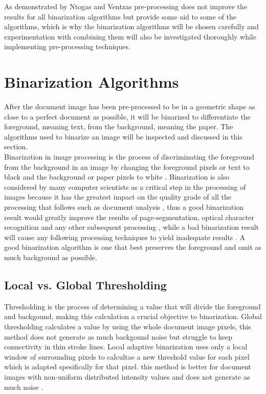 \documentclass[11pt]{article}
\begin{document}
			As demonstrated by Ntogas and Ventzas \cite{ntogas2008binarization} pre-processing does not improve the results for all binarization algorithms but provide some aid to some of the algorithms, which is why the binarization algorithms will be chosen carefully and experimentation with combining them will also be investigated thoroughly while implementing pre-processing techniques.

    \section{Binarization Algorithms}%
			After the document image has been pre-processed to be in a geometric shape as close to a perfect document as possible, it will be binarized to differentiate the foreground, meaning text, from the background, meaning the paper. The algorithms used to binarize an image will be inspected and discussed in this section.\\

  		Binarization in image processing is the process of discriminating the foreground from the background in an image by changing the foreground pixels or text to black and the background or paper pixels to white \cite{ntogas2008binarization}. Binarization is also considered by many computer scientists as a critical step in the processing of images because it has the greatest impact on the quality grade of all the processing that follows such as document analysis \cite{jacob2014survey}, thus a good binarization result would greatly improve the results of page-segmentation, optical character recognition and any other subsequent processing \cite{agrawal2011stroke}, while a bad binarization result will cause any following processing techniques to yield inadequate results \cite{howe2011laplacian}. A good binarization algorithm is one that best preserves the foreground and omit as much background as possible.

			\subsection{Local vs. Global Thresholding}
				Thresholding is the process of determining a value that will divide the foreground and backgound, making this calculation a crucial objective to binarization. Global thresholding calculates a value by using the whole document image pixels, this method does not generate as much backgound noise but struggle to keep connectivity in thin stroke lines. Local adaptive binarization uses only a local window of surrounding pixels to calcultae a new threshold value for each pixel which is adapted spesifically for that pixel. this method is better for document images with non-uniform distributed intensity values and does not generate as much noise \cite{chen2017broken}.
\end{document}
